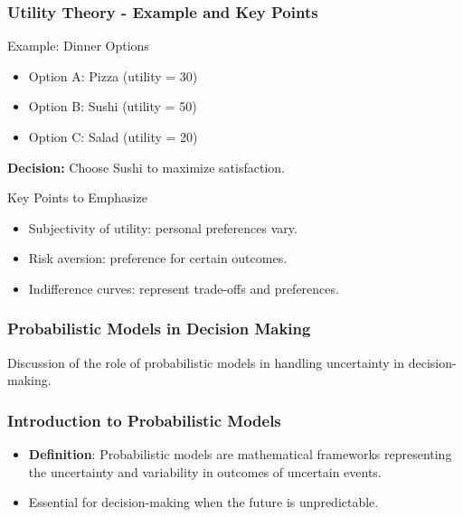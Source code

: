 \documentclass[aspectratio=169]{beamer}
\begin{document}
\begin{frame}[fragile]
    \frametitle{Utility Theory - Example and Key Points}
    \begin{block}{Example: Dinner Options}
        \begin{itemize}
            \item Option A: Pizza (utility = 30)
            \item Option B: Sushi (utility = 50)
            \item Option C: Salad (utility = 20)
        \end{itemize}
        \textbf{Decision:} Choose Sushi to maximize satisfaction.
    \end{block}
    
    \begin{block}{Key Points to Emphasize}
        \begin{itemize}
            \item Subjectivity of utility: personal preferences vary.
            \item Risk aversion: preference for certain outcomes.
            \item Indifference curves: represent trade-offs and preferences.
        \end{itemize}
    \end{block}
\end{frame}

\begin{frame}[fragile]
    \frametitle{Probabilistic Models in Decision Making}
    Discussion of the role of probabilistic models in handling uncertainty in decision-making.
\end{frame}

\begin{frame}[fragile]
    \frametitle{Introduction to Probabilistic Models}
    \begin{itemize}
        \item \textbf{Definition}: Probabilistic models are mathematical frameworks representing the uncertainty and variability in outcomes of uncertain events.
        \item Essential for decision-making when the future is unpredictable.
    \end{itemize}
\end{frame}
\end{document}
